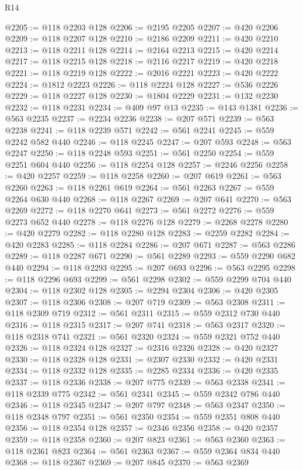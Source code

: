 \begin{lexlean}{R14}
\begin{coremodule}
@2205 := @118 @2203 @128
@2206 := @2195 @2205
@2207 := @420 @2206
@2209 := @118 @2207 @128
@2210 := @2186 @2209
@2211 := @420 @2210
@2213 := @118 @2211 @128
@2214 := @2164 @2213
@2215 := @420 @2214
@2217 := @118 @2215 @128
@2218 := @2116 @2217
@2219 := @420 @2218
@2221 := @118 @2219 @128
@2222 := @2016 @2221
@2223 := @420 @2222
@2224 := @1812 @2223
@2226 := @118 @2224 @128
@2227 := @536 @2226
@2229 := @118 @2227 @128
@2230 := @1804 @2229
@2231 := @132 @2230
@2232 := @118 @2231
@2234 := @409 @97 @13
@2235 := @143 @1381
@2236 := @563 @2235
@2237 := @2234 @2236
@2238 := @207 @571
@2239 := @563 @2238
@2241 := @118 @2239 @571
@2242 := @561 @2241
@2245 := @559 @2242 @582 @440
@2246 := @118 @2245
@2247 := @207 @593
@2248 := @563 @2247
@2250 := @118 @2248 @593
@2251 := @561 @2250
@2254 := @559 @2251 @604 @440
@2256 := @118 @2254 @128
@2257 := @2246 @2256
@2258 := @420 @2257
@2259 := @118 @2258
@2260 := @207 @619
@2261 := @563 @2260
@2263 := @118 @2261 @619
@2264 := @561 @2263
@2267 := @559 @2264 @630 @440
@2268 := @118 @2267
@2269 := @207 @641
@2270 := @563 @2269
@2272 := @118 @2270 @641
@2273 := @561 @2272
@2276 := @559 @2273 @652 @440
@2278 := @118 @2276 @128
@2279 := @2268 @2278
@2280 := @420 @2279
@2282 := @118 @2280 @128
@2283 := @2259 @2282
@2284 := @420 @2283
@2285 := @118 @2284
@2286 := @207 @671
@2287 := @563 @2286
@2289 := @118 @2287 @671
@2290 := @561 @2289
@2293 := @559 @2290 @682 @440
@2294 := @118 @2293
@2295 := @207 @693
@2296 := @563 @2295
@2298 := @118 @2296 @693
@2299 := @561 @2298
@2302 := @559 @2299 @704 @440
@2304 := @118 @2302 @128
@2305 := @2294 @2304
@2306 := @420 @2305
@2307 := @118 @2306
@2308 := @207 @719
@2309 := @563 @2308
@2311 := @118 @2309 @719
@2312 := @561 @2311
@2315 := @559 @2312 @730 @440
@2316 := @118 @2315
@2317 := @207 @741
@2318 := @563 @2317
@2320 := @118 @2318 @741
@2321 := @561 @2320
@2324 := @559 @2321 @752 @440
@2326 := @118 @2324 @128
@2327 := @2316 @2326
@2328 := @420 @2327
@2330 := @118 @2328 @128
@2331 := @2307 @2330
@2332 := @420 @2331
@2334 := @118 @2332 @128
@2335 := @2285 @2334
@2336 := @420 @2335
@2337 := @118 @2336
@2338 := @207 @775
@2339 := @563 @2338
@2341 := @118 @2339 @775
@2342 := @561 @2341
@2345 := @559 @2342 @786 @440
@2346 := @118 @2345
@2347 := @207 @797
@2348 := @563 @2347
@2350 := @118 @2348 @797
@2351 := @561 @2350
@2354 := @559 @2351 @808 @440
@2356 := @118 @2354 @128
@2357 := @2346 @2356
@2358 := @420 @2357
@2359 := @118 @2358
@2360 := @207 @823
@2361 := @563 @2360
@2363 := @118 @2361 @823
@2364 := @561 @2363
@2367 := @559 @2364 @834 @440
@2368 := @118 @2367
@2369 := @207 @845
@2370 := @563 @2369

\end{coremodule}
\end{lexlean}
